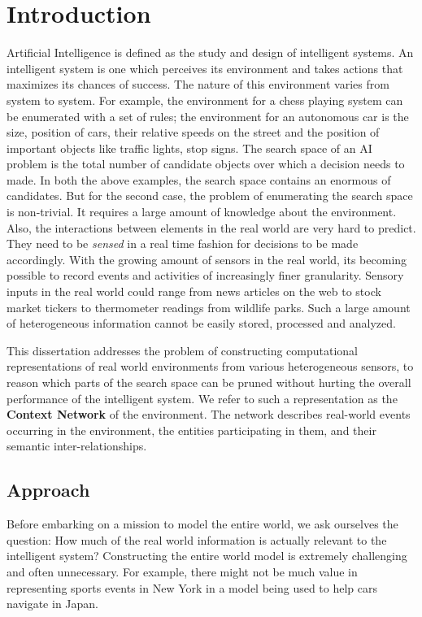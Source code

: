 \chapter{Introduction}

Artificial Intelligence is defined as the study and design of intelligent systems. An intelligent system is one which perceives its environment and takes actions that maximizes its chances of success. The nature of this environment varies from system to system. For example, the environment for a chess playing system can be enumerated with a set of rules; the environment for an autonomous car is the size, position of cars, their relative speeds on the street and the position of important objects like traffic lights, stop signs. The search space of an AI problem is the total number of candidate objects over which a decision needs to made. In both the above examples, the search space contains an enormous of candidates. But for the second case, the problem of enumerating the search space is non-trivial. It requires a large amount of knowledge about the environment. Also, the interactions between elements in the real world are very hard to predict. They need to be \textit{sensed} in a real time fashion for decisions to be made accordingly. With the growing amount of sensors in the real world, its becoming possible to record events and activities of increasingly finer granularity. Sensory inputs in the real world could range from news articles on the web to stock market tickers to thermometer readings from wildlife parks. Such a large amount of heterogeneous information cannot be easily stored, processed and analyzed. 

This dissertation addresses the problem of constructing computational representations of real world environments from various heterogeneous sensors, to reason which parts of the search space can be pruned without hurting the overall performance of the intelligent system. We refer to such a representation as the \textbf{Context Network} of the environment. The network describes real-world events occurring in the environment, the entities participating in them, and their semantic inter-relationships.

\section{Approach}
Before embarking on a mission to model the entire world, we ask ourselves the question: How much of the real world information is actually relevant to the intelligent system? Constructing the entire world model is extremely challenging and often unnecessary. For example, there might not be much value in representing sports events in New York in a model being used to help cars navigate in Japan. 

